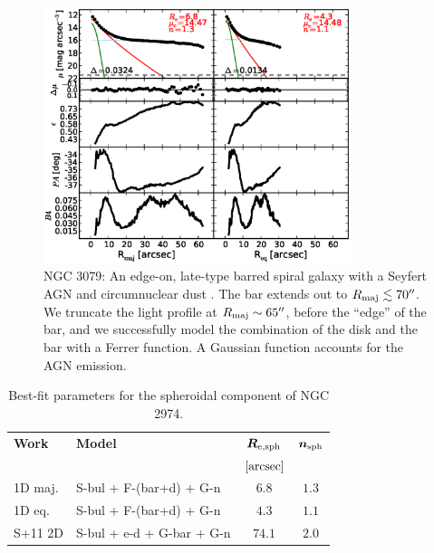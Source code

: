 \documentclass[preprint2]{emulateapj}
\newcommand{\fitfigurewidth}{0.8\textwidth}
\begin{document}
  \begin{figure}[h]
  \begin{center}
  \includegraphics[width=\fitfigurewidth]{images/n3079_1Dfit.eps}
  \caption{NGC 3079:
  An edge-on, late-type barred spiral galaxy 
  with a Seyfert AGN \citep{veroncettyveron2006} and circumnuclear dust \citep{martini2003}. 
  The bar extends out to $R_{\rm maj} \lesssim 70''$. 
  We truncate the light profile at $R_{\rm maj} \sim 65''$, before the ``edge'' of the bar, 
  and we successfully model the combination of the disk and the bar with a Ferrer function. 
  A Gaussian function accounts for the AGN emission. 
  }
  \end{center}
  \end{figure}
  
  \begin{table}[h]
  \small
  \caption{Best-fit parameters for the spheroidal component of NGC 2974.}
  \begin{center}
  \begin{tabular}{llcc}
  \hline
  {\bf Work} & {\bf Model}   & $\bm R_{\rm e,sph}$    & $\bm n_{\rm sph}$ \\
    &  &  $[\rm arcsec]$ & \\
  \hline
  1D maj. & S-bul + F-(bar+d) + G-n  & $6.8$  &  $1.3$ \\
  1D eq.  & S-bul + F-(bar+d) + G-n  & $4.3$  &  $1.1$ \\
  \hline
  S+11 2D         & S-bul + e-d + G-bar + G-n & $74.1$  &  $2.0$ \\
  \hline
  \end{tabular}
  \end{center}
  \label{tab:n2974}
  \end{table}
\end{document}
